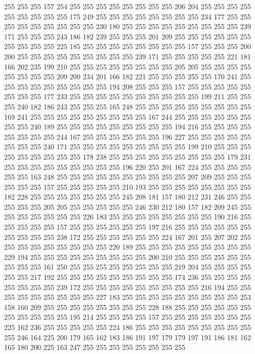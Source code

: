 255 255 255 157 254 255 255 255 255 255 255 255 255 206 204 255 255 255 255 255
255 255 255 255 175 249 255 255 255 255 255 255 255 255 234 177 255 255 255 255
255 255 255 255 255 230 180 255 255 255 255 255 255 255 255 255 239 171 255 255
255 243 186 182 239 255 255 255 201 209 255 255 255 255 255 255 255 255 255 255
225 185 255 255 255 255 255 255 255 255 157 255 255 255 200 200 255 255 255 255
255 255 255 255 255 239 171 255 255 255 255 255 221 181 166 202 235 199 210 255
255 255 255 255 255 255 255 205 205 255 255 255 255 255 255 255 255 209 200 234
201 166 182 221 255 255 255 255 255 170 241 255 255 255 255 255 255 255 255 255
194 208 255 255 255 157 255 255 255 255 255 255 255 255 177 233 255 255 255 255
255 255 255 255 255 255 199 211 255 255 255 240 182 186 243 255 255 255 165 248
255 255 255 255 255 255 255 255 255 169 241 255 255 255 255 255 255 255 255 255
167 244 255 255 255 255 255 255 255 255 240 189 255 255 255 255 255 255 255 255
255 194 216 255 255 255 255 255 255 255 255 244 167 255 255 255 255 255 255 196
227 255 255 255 255 255 255 255 255 240 171 255 255 255 255 255 255 255 255 255
199 210 255 255 255 255 255 255 255 255 255 178 238 255 255 255 255 255 255 255
255 255 179 231 255 255 255 255 255 255 255 255 255 196 220 255 201 167 224 255
255 255 255 255 255 163 248 255 255 255 255 255 255 255 255 255 255 207 209 255
255 255 255 255 255 157 255 255 255 255 255 210 193 255 255 255 255 255 255 255
255 182 228 255 255 255 255 255 255 255 245 208 181 157 180 212 231 246 255 255
255 255 255 205 205 255 255 255 255 255 246 230 212 180 157 182 209 245 255 255
255 255 255 255 255 226 183 255 255 255 255 255 255 255 255 190 216 255 255 255
255 255 157 255 255 255 255 255 255 197 216 255 255 255 255 255 255 255 255 255
255 238 172 255 255 255 255 255 255 224 167 201 255 207 202 255 255 255 255 255
255 255 255 255 220 189 255 255 255 255 255 255 255 255 255 229 194 255 255 255
255 255 255 255 255 255 200 210 255 255 255 255 255 255 255 255 255 161 250 255
255 255 255 255 255 255 255 219 204 255 255 255 255 255 255 217 192 255 255 255
255 255 255 255 255 255 174 236 255 255 255 255 255 255 255 255 239 172 255 255
255 255 255 255 255 255 255 216 194 255 255 255 255 255 255 255 255 255 227 183
255 255 255 255 255 255 255 255 255 253 158 160 209 255 255 255 255 255 255 255
255 228 188 255 255 255 255 255 255 255 255 255 255 255 195 214 255 255 255 255
157 255 255 255 255 255 255 255 225 162 236 255 255 255 255 255 224 186 255 255
255 255 255 255 255 255 255 255 246 164 225 200 179 165 162 183 186 191 197 179
179 197 191 186 181 162 165 180 200 225 163 247 255 255 255 255 255 255 255 255
